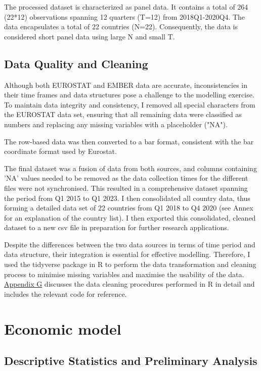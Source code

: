 \documentclass[12pt]{article}
\begin{document}
The processed dataset is characterized as panel data. It contains a total of 264 (22*12) observations spanning 12 quarters (T=12) from 2018Q1-2020Q4. The data encapsulates a total of 22 countries (N=22). Consequently, the data is considered short panel data using large N and small T.

\subsection{Data Quality and Cleaning}

Although both EUROSTAT and EMBER data are accurate, inconsistencies in their time frames and data structures pose a challenge to the modelling exercise. To maintain data integrity and consistency, I removed all special characters from the EUROSTAT data set, ensuring that all remaining data were classified as numbers and replacing any missing variables with a placeholder ("NA").

The row-based data was then converted to a bar format, consistent with the bar coordinate format used by Eurostat.

The final dataset was a fusion of data from both sources, and columns containing 'NA' values needed to be removed as the data collection times for the different files were not synchronised. This resulted in a comprehensive dataset spanning the period from Q1 2015 to Q1 2023. I then consolidated all country data, thus forming a detailed data set of 22 countries from Q1 2018 to Q4 2020 (see Annex for an explanation of the country list). I then exported this consolidated, cleaned dataset to a new csv file in preparation for further research applications.

Despite the differences between the two data sources in terms of time period and data structure, their integration is essential for effective modelling. Therefore, I used the tidyverse package in R to perform the data transformation and cleaning process to minimise missing variables and maximise the usability of the data. \hyperlink{G}{Appendix G} discusses the data cleaning procedures performed in R in detail and includes the relevant code for reference.


\section{Economic model}

\subsection{Descriptive Statistics and Preliminary Analysis}
\end{document}
